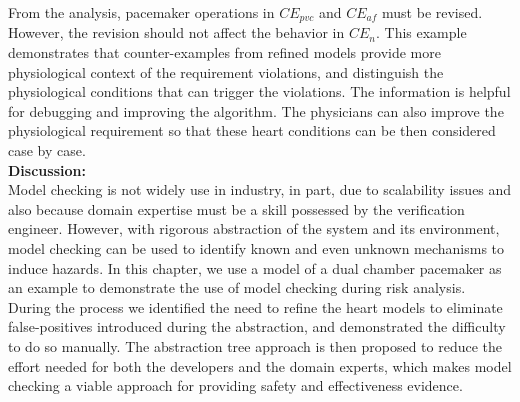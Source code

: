 From the analysis, pacemaker operations in $CE_{pvc}$ and $CE_{af}$ must be revised. However, the revision should not affect the behavior in $CE_{n}$. This example demonstrates that counter-examples from refined models provide more physiological context of the requirement violations, and distinguish the physiological conditions that can trigger the violations. The information is helpful for debugging and improving the algorithm. The physicians can also improve the physiological requirement so that these heart conditions can be then considered case by case.\\

\noindent\textbf{Discussion:}\\
Model checking is not widely use in industry, in part, due to scalability issues and also because domain expertise must be a skill possessed by the verification engineer. However, with rigorous abstraction of the system and its environment, model checking can be used to identify 
known and even unknown mechanisms to induce hazards. In this chapter, we use a model of a dual chamber pacemaker as an example to demonstrate the use of model checking during risk analysis. During the process we identified the need to refine the heart models to eliminate false-positives introduced during the abstraction, and demonstrated the difficulty to do so manually. The abstraction tree approach is then proposed to reduce the effort needed for both the developers and the domain experts, which makes model checking a viable approach for providing safety and effectiveness evidence. 
